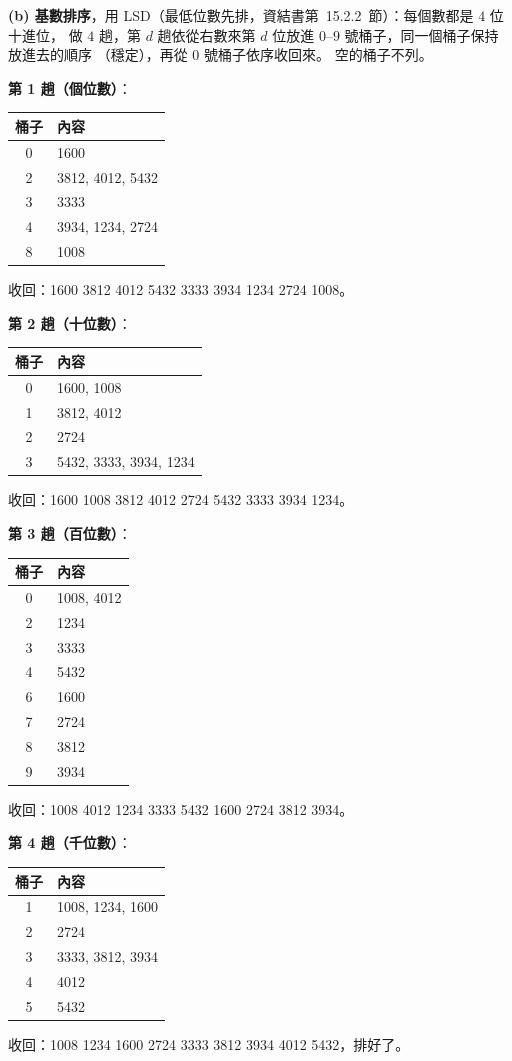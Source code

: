 \begin{pastsoln}
\textbf{(b) 基數排序}，用 LSD（最低位數先排，資結書第~15.2.2~節）：每個數都是 $4$ 位十進位，
做 $4$ 趟，第 $d$ 趟依從右數來第 $d$ 位放進 $0$--$9$ 號桶子，同一個桶子保持放進去的順序
（穩定），再從 $0$ 號桶子依序收回來。 空的桶子不列。

\textbf{第 1 趟（個位數）}：
\begin{center}
\small
\begin{tabular}{cl}
\toprule
桶子 & 內容 \\
\midrule
0 & 1600 \\
2 & 3812, 4012, 5432 \\
3 & 3333 \\
4 & 3934, 1234, 2724 \\
8 & 1008 \\
\bottomrule
\end{tabular}
\end{center}
收回：1600 3812 4012 5432 3333 3934 1234 2724 1008。

\textbf{第 2 趟（十位數）}：
\begin{center}
\small
\begin{tabular}{cl}
\toprule
桶子 & 內容 \\
\midrule
0 & 1600, 1008 \\
1 & 3812, 4012 \\
2 & 2724 \\
3 & 5432, 3333, 3934, 1234 \\
\bottomrule
\end{tabular}
\end{center}
收回：1600 1008 3812 4012 2724 5432 3333 3934 1234。

\textbf{第 3 趟（百位數）}：
\begin{center}
\small
\begin{tabular}{cl}
\toprule
桶子 & 內容 \\
\midrule
0 & 1008, 4012 \\
2 & 1234 \\
3 & 3333 \\
4 & 5432 \\
6 & 1600 \\
7 & 2724 \\
8 & 3812 \\
9 & 3934 \\
\bottomrule
\end{tabular}
\end{center}
收回：1008 4012 1234 3333 5432 1600 2724 3812 3934。

\textbf{第 4 趟（千位數）}：
\begin{center}
\small
\begin{tabular}{cl}
\toprule
桶子 & 內容 \\
\midrule
1 & 1008, 1234, 1600 \\
2 & 2724 \\
3 & 3333, 3812, 3934 \\
4 & 4012 \\
5 & 5432 \\
\bottomrule
\end{tabular}
\end{center}
收回：1008 1234 1600 2724 3333 3812 3934 4012 5432，排好了。


\end{pastsoln}
